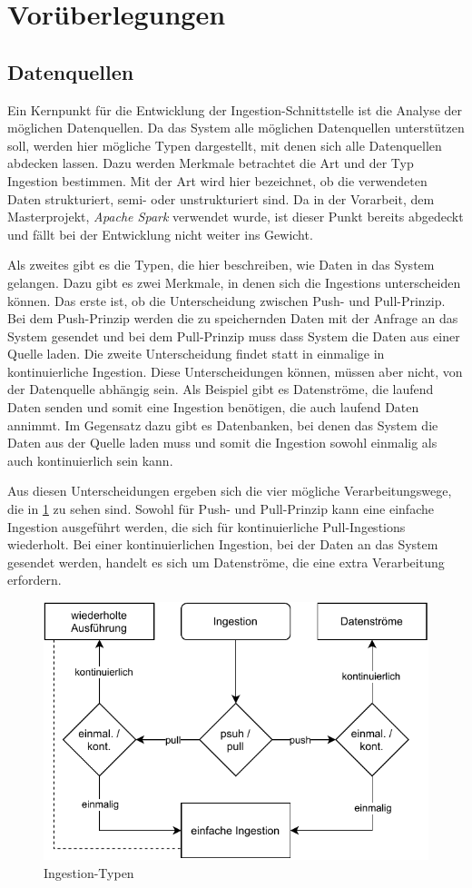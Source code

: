 \section{Vorüberlegungen}

\subsection{Datenquellen}
Ein Kernpunkt für die Entwicklung der Ingestion-Schnittstelle ist die Analyse der möglichen Datenquellen.
Da das System alle möglichen Datenquellen unterstützen soll, werden hier mögliche Typen dargestellt, mit denen sich alle Datenquellen abdecken lassen.
Dazu werden Merkmale betrachtet die Art und der Typ Ingestion bestimmen.
Mit der Art wird hier bezeichnet, ob die verwendeten Daten strukturiert, semi- oder unstrukturiert sind.
Da in der Vorarbeit, dem Masterprojekt, \textit{Apache Spark} verwendet wurde, ist dieser Punkt bereits abgedeckt und fällt bei der Entwicklung nicht weiter ins Gewicht.

Als zweites gibt es die Typen, die hier beschreiben, wie Daten in das System gelangen.
Dazu gibt es zwei Merkmale, in denen sich die Ingestions unterscheiden können.
Das erste ist, ob die Unterscheidung zwischen Push- und Pull-Prinzip.
Bei dem Push-Prinzip werden die zu speichernden Daten mit der Anfrage an das System gesendet und bei dem Pull-Prinzip muss dass System die Daten aus einer Quelle laden.
Die zweite Unterscheidung findet statt in einmalige in kontinuierliche Ingestion.
Diese Unterscheidungen können, müssen aber nicht, von der Datenquelle abhängig sein.
Als Beispiel gibt es Datenströme, die laufend Daten senden und somit eine Ingestion benötigen, die auch laufend Daten annimmt.
Im Gegensatz dazu gibt es Datenbanken, bei denen das System die Daten aus der Quelle laden muss und somit die Ingestion sowohl einmalig als auch kontinuierlich sein kann.

Aus diesen Unterscheidungen ergeben sich die vier mögliche Verarbeitungswege, die in \ref{fig:ingestion_types} zu sehen sind.
Sowohl für Push- und Pull-Prinzip kann eine einfache Ingestion ausgeführt werden, die sich für kontinuierliche Pull-Ingestions wiederholt.
Bei einer kontinuierlichen Ingestion, bei der Daten an das System gesendet werden, handelt es sich um Datenströme, die eine extra Verarbeitung erfordern.

\begin{figure}
  \centering
  \includegraphics{Grafiken/ingestion-types.pdf}
  \caption{Ingestion-Typen}
  \label{fig:ingestion_types}
\end{figure}
